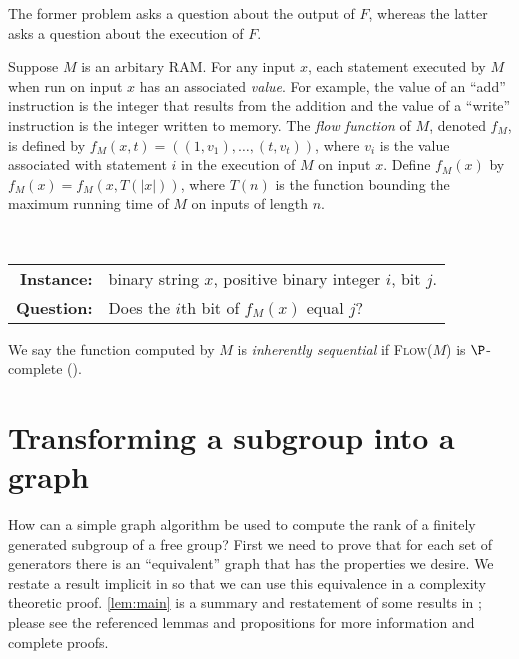 \documentclass{article}
\begin{document}
The former problem asks a question about the output of $F$, whereas the latter asks a question about the execution of $F$.

Suppose $M$ is an arbitary RAM.
For any input $x$, each statement executed by $M$ when run on input $x$ has an associated \emph{value}.
For example, the value of an ``add'' instruction is the integer that results from the addition and the value of a ``write'' instruction is the integer written to memory.
The \emph{flow function} of $M$, denoted $f_M$, is defined by $f_M(x, t) = ((1, v_1), \dotsc, (t, v_t))$, where $v_i$ is the value associated with statement $i$ in the execution of $M$ on input $x$.
Define $f_M(x)$ by $f_M(x) = f_M(x, T(|x|))$, where $T(n)$ is the function bounding the maximum running time of $M$ on inputs of length $n$.

\begin{definition}
  \mbox{} \\
  \begin{tabular}{r p{9.5cm}}
    \textbf{Instance:} & binary string $x$, positive binary integer $i$, bit $j$. \\
    \textbf{Question:} & Does the $i$th bit of $f_M(x)$ equal $j$?
  \end{tabular}
\end{definition}

We say the function computed by $M$ is \emph{inherently sequential} if \textsc{Flow($M$)} is $\P$-complete (\autocite[Definition~8.2.2]{ghr95}).

\section{Transforming a subgroup into a graph}

How can a simple graph algorithm be used to compute the rank of a finitely generated subgroup of a free group?
First we need to prove that for each set of generators there is an ``equivalent'' graph that has the properties we desire.
We restate a result implicit in \autocite{km02} so that we can use this equivalence in a complexity theoretic proof.
\autoref{lem:main} is a summary and restatement of some results in \autocite{km02}; please see the referenced lemmas and propositions for more information and complete proofs.
\end{document}
